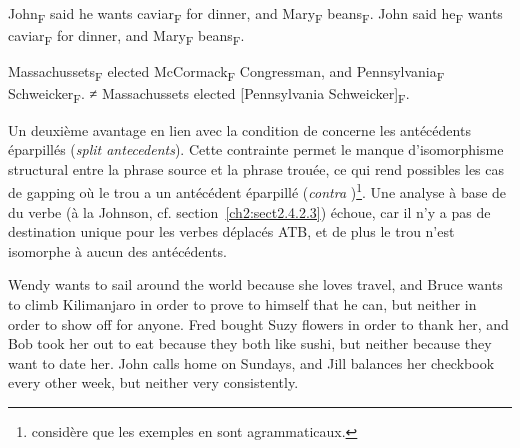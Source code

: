 \ea \label{ch2:ex204}
\ea John\textsubscript{F} said he wants caviar\textsubscript{F} for dinner, and Mary\textsubscript{F} beans\textsubscript{F}. \label{ch2:ex204a}
\ex John said he\textsubscript{F} wants caviar\textsubscript{F} for dinner, and
Mary\textsubscript{F} beans\textsubscript{F}. \citep{Sag1980} \label{ch2:ex204b}
\z
\z


\ea \label{ch2:ex205}
\ea Massachussets\textsubscript{F} elected McCormack\textsubscript{F} Congressman, and Pennsylvania\textsubscript{F} Schweicker\textsubscript{F}. \label{ch2:ex205a}      
\ex ≠ Massachussets elected [Pennsylvania Schweicker]\textsubscript{F}. \citep{Hankamer1973} \label{ch2:ex205b}
\z
\z

Un deuxième avantage en lien avec la condition de \citet{Merchant2001} concerne les antécédents éparpillés (\textit{split antecedents}). Cette contrainte permet le manque d’isomorphisme structural entre la phrase source et la phrase trouée, ce qui rend possibles les cas de gapping  où le trou a un antécédent éparpillé (\textit{contra} \citealt{HankamerEtAl1976})\footnote{
 \citet[304]{Johnson2009} considère que les exemples en  sont agrammaticaux.}. Une analyse à base de  du verbe (à la Johnson, cf. section~\ref{ch2:sect2.4.2.3}) échoue, car il n’y a pas de destination unique pour les verbes déplacés ATB, et de plus le trou n’est isomorphe à aucun des antécédents.

\ea \label{ch2:ex206}
\ea Wendy wants to sail around the world because she loves travel, and Bruce wants to climb Kilimanjaro in order to prove to himself that he can, but neither in order to show off for anyone.  
\ex Fred bought Suzy flowers in order to thank her, and Bob took her out to eat because they both like sushi, but neither because they want to date her.
\ex John calls home on Sundays, and Jill balances her checkbook every other week, but neither very consistently. \citep{Coppock2001}
\z
\z

